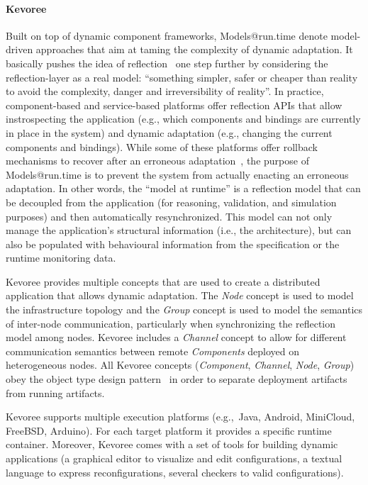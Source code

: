 \paragraph{Kevoree}
Built on top of dynamic component frameworks, Models@run.time denote model-driven approaches that aim at taming the complexity of dynamic adaptation.
It basically pushes the idea of reflection~\cite{morin09a} one step further by considering the reflection-layer as a real model: ``something simpler, safer or cheaper than reality to avoid the complexity, danger and irreversibility of reality''.
In practice, component-based and service-based platforms offer reflection APIs that allow instrospecting the application (e.g., which components and bindings are currently in place in the system) and dynamic adaptation (e.g., changing the current components and bindings).
While some of these platforms offer rollback mechanisms to recover after an erroneous adaptation~\cite{leger2010reliable}, the purpose of Models@run.time is to prevent the system from actually enacting an erroneous adaptation. 
In other words, the ``model at runtime'' is a reflection model that can be decoupled from the application (for reasoning, validation, and simulation purposes) and then automatically resynchronized.
This model can not only manage the application's structural information (i.e., the architecture), but can also be populated with behavioural information from the specification or the runtime monitoring data.

Kevoree provides multiple concepts that are used to create a distributed application that allows dynamic adaptation. The \emph{Node} concept is used to model the infrastructure topology and the \emph{Group} concept is used to model the semantics of inter-node communication, particularly when synchronizing the reflection model among nodes. 
Kevoree includes a \emph{Channel} concept to allow for different communication semantics between remote \emph{Components} deployed on heterogeneous nodes. 
All Kevoree concepts (\textit{Component}, \textit{Channel}, \textit{Node}, \textit{Group}) obey the object type design pattern~\cite{johnson_type_1997} in order to separate deployment artifacts from running artifacts.  

Kevoree supports multiple execution platforms (e.g.,~Java, Android, MiniCloud, FreeBSD, Arduino). For each target platform it provides a specific runtime container. 
Moreover, Kevoree comes with a set of tools for building dynamic applications (a graphical editor to visualize and edit configurations, a textual language to express reconfigurations, several checkers to valid configurations). 

